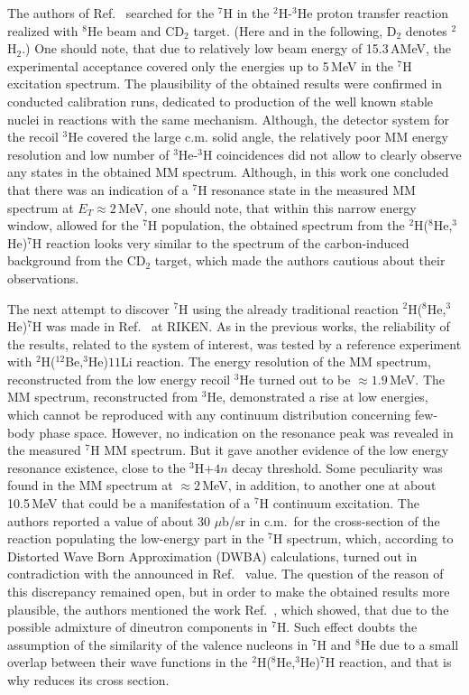 The authors of Ref.\ \cite{Fortier:2007} searched for the $^7$H in the $^2$H-$^3$He proton transfer reaction realized with $^8$He beam and CD$_{2}$ target. (Here and in the following, D$_2$ denotes
$^2$H$_2$.)
One should note, that due to relatively low beam energy of 15.3\,AMeV, the experimental acceptance covered only the energies up to 5\,MeV in the $^{7}$H excitation spectrum.
The plausibility of the obtained results were confirmed in conducted calibration runs, dedicated to production of the well known stable nuclei in reactions with the same mechanism.
Although, the detector system for the recoil $^3$He covered the large c.m. solid angle, the relatively poor MM energy resolution and low number of $^3$He-$^3$H coincidences did not allow to clearly observe any states in the obtained MM spectrum.
Although, in this work one concluded that there was an indication of a $^7$H resonance state in the measured MM spectrum at $E_T \approx 2$\,MeV, one should note, that within this narrow energy window, allowed for the $^{7}$H population, the obtained spectrum from the $^2$H($^8$He,$^3$He)$^7$H reaction looks very similar to the spectrum of the carbon-induced background from the CD$_2$ target, which made the authors cautious about their observations. 

The next attempt to discover $^{7}$H  using the already traditional reaction $^2$H($^8$He,$^3$He)$^7$H was made in Ref.\ \cite{Nikolskii:2010} at RIKEN.
As in the previous works, the reliability of the results, related to the system of interest, was tested by a reference experiment with $^2$H($^12$Be,$^3$He)$11$Li reaction.
The energy resolution of the MM spectrum, reconstructed from the low energy recoil $^3$He turned out to be $\approx 1.9$\,MeV.
The MM spectrum, reconstructed from $^3$He, demonstrated a rise at low energies, which cannot be reproduced with any continuum distribution concerning few-body phase space. 
However, no indication on the resonance peak was revealed in the measured $^7$H MM spectrum.
But it gave another evidence of the low energy resonance existence, close to the $^3$H+$4n$ decay threshold. 
Some peculiarity was found in the MM spectrum at $\approx 2$\,MeV, in addition, to another one at about 10.5\,MeV that could be a manifestation of a $^{7}$H continuum excitation.
The authors reported a value of about 30 $\mu$b/sr in c.m.\ for the cross-section of the reaction populating the low-energy part in the $^7$H spectrum, which, according to Distorted Wave Born Approximation (DWBA) calculations, turned out in contradiction with the announced in Ref.\ \cite{Caamano:2007} value.
The question of the reason of this discrepancy remained open, but in order to make the obtained results more plausible, the authors mentioned the work Ref.\ \cite{Aoyama:2009}, which showed, that due to the possible admixture of dineutron components in $^{7}$H.
Such effect doubts the assumption of the similarity of the valence nucleons in $^{7}$H and $^{8}$He due to a small overlap between their wave functions in the $^2$H($^8$He,$^3$He)$^7$H reaction, and that is why reduces its cross section.

